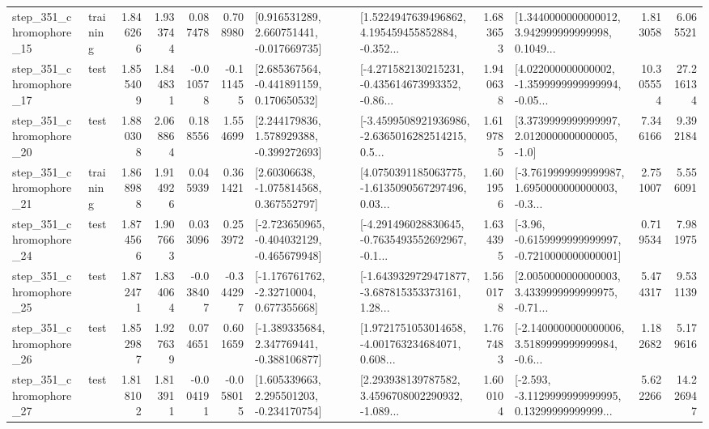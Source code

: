 \begin{tabular}{llrrrrllrlrr}
  step\_351\_chromophore\_15 &  training &      1.846266 &    1.933744 &      0.087478 &  0.708980 &    [0.916531289, 2.660751441, -0.017669735] &  [1.5224947639496862, 4.195459455852884, -0.352... &       1.683653 &  [1.3440000000000012, 3.942999999999998, 0.1049... &            1.813058 &          6.065521 \\
  step\_351\_chromophore\_17 &      test &      1.855409 &    1.844831 &     -0.010578 & -0.111455 &    [2.685367564, -0.441891159, 0.170650532] &  [-4.271582130215231, -0.435614673993352, -0.86... &       1.940638 &  [4.022000000000002, -1.3599999999999994, -0.05... &           10.305554 &         27.216134 \\
  step\_351\_chromophore\_20 &      test &      1.880308 &    2.068864 &      0.188556 &  1.554699 &    [2.244179836, 1.578929388, -0.399272693] &  [-3.4599508921936986, -2.6365016282514215, 0.5... &       1.619785 &     [3.3739999999999997, 2.0120000000000005, -1.0] &            7.346166 &          9.392184 \\
  step\_351\_chromophore\_21 &  training &      1.868988 &    1.914926 &      0.045939 &  0.361421 &     [2.60306638, -1.075814568, 0.367552797] &  [4.0750391185063775, -1.6135090567297496, 0.03... &       1.601956 &  [-3.7619999999999987, 1.6950000000000003, -0.3... &            2.751007 &          5.556091 \\
  step\_351\_chromophore\_24 &      test &      1.874566 &    1.907663 &      0.033096 &  0.253972 &  [-2.723650965, -0.404032129, -0.465679948] &  [-4.291496028830645, -0.7635493552692967, -0.1... &       1.634395 &  [-3.96, -0.6159999999999997, -0.7210000000000001] &            0.719534 &          7.981975 \\
  step\_351\_chromophore\_25 &      test &      1.872471 &    1.834064 &     -0.038407 & -0.344297 &    [-1.176761762, -2.32710004, 0.677355668] &  [-1.6439329729471877, -3.687815353373161, 1.28... &       1.560178 &  [2.0050000000000003, 3.4339999999999975, -0.71... &            5.474317 &          9.531139 \\
  step\_351\_chromophore\_26 &      test &      1.852987 &    1.927639 &      0.074651 &  0.601659 &   [-1.389335684, 2.347769441, -0.388106877] &  [1.9721751053014658, -4.001763234684071, 0.608... &       1.767483 &  [-2.1400000000000006, 3.5189999999999984, -0.6... &            1.182682 &          5.179616 \\
  step\_351\_chromophore\_27 &      test &      1.818102 &    1.813911 &     -0.004191 & -0.058015 &    [1.605339663, 2.295501203, -0.234170754] &  [2.293938139787582, 3.4596708002290932, -1.089... &       1.600104 &  [-2.593, -3.1129999999999995, 0.13299999999999... &            5.622266 &         14.226947 \\

\end{tabular}
